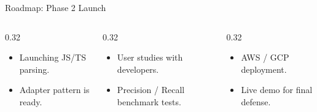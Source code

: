 \documentclass[aspectratio=169, 10pt]{beamer}
\begin{document}
\begin{frame}{Roadmap: Phase 2 Launch}
  \begin{columns}[T]
    \begin{column}{0.32\textwidth}
      \begin{tcolorbox}[colback=acrLight,colframe=acrAccent,title={\textbf{Language Expansion}}, height=5cm]
        \small
        \begin{itemize}
          \item Launching JS/TS parsing.
          \item Adapter pattern is ready.
        \end{itemize}
      \end{tcolorbox}
    \end{column}
    \begin{column}{0.32\textwidth}
      \begin{tcolorbox}[colback=acrLight,colframe=acrGold,title={\textbf{Scientific Validation}}, height=5cm]
        \small
        \begin{itemize}
          \item User studies with developers.
          \item Precision / Recall benchmark tests.
        \end{itemize}
      \end{tcolorbox}
    \end{column}
    \begin{column}{0.32\textwidth}
      \begin{tcolorbox}[colback=acrLight,colframe=acrBlue,title={\textbf{Cloud Readiness}}, height=5cm]
        \small
        \begin{itemize}
          \item AWS / GCP deployment.
          \item Live demo for final defense.
        \end{itemize}
      \end{tcolorbox}
    \end{column}
  \end{columns}
\end{frame}
\end{document}
